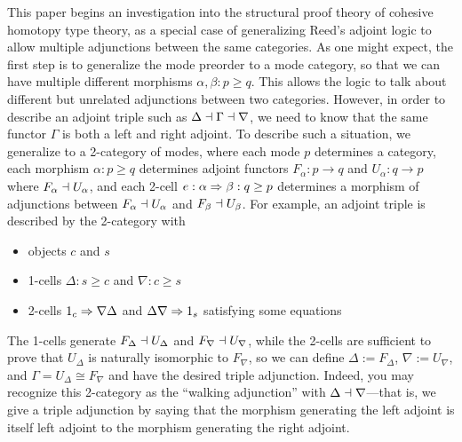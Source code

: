 \documentclass{drl-common/llncs}
\begin{document}
This paper begins an investigation into the structural proof theory of
cohesive homotopy type theory, as a special case of generalizing Reed's
adjoint logic to allow multiple adjunctions between the same categories.
As one might expect, the first step is to generalize the mode preorder
to a mode category, so that we can have multiple different morphisms
$\alpha, \beta : p\ge q$.  This allows the logic to talk about different
but unrelated adjunctions between two categories.  However, in order to
describe an adjoint triple such as $\Delta \dashv \Gamma \dashv \nabla$, we
need to know that the same functor $\Gamma$ is both a left and right
adjoint.  To describe such a situation, we generalize to a 2-category of
modes, where each mode $p$ determines a category, each morphism $\alpha
: p \ge q$ determines adjoint functors $F_\alpha : p \to q$ and
$U_\alpha : q \to p$ where $F_\alpha \dashv U_\alpha$, and each 2-cell $e :
\alpha \Rightarrow \beta : q \ge p$ determines a morphism of adjunctions between 
$F_\alpha \dashv U_\alpha$ and $F_\beta \dashv U_\beta$.  For example, an
adjoint triple is described by the 2-category with
\begin{itemize}
\item objects $c$ and $s$
\item 1-cells $\Delta : s \ge c$ and $\nabla : c \ge s$
\item 2-cells $1_c \Rightarrow \nabla \Delta$ 
and $\Delta \nabla \Rightarrow 1_s$ satisfying 
some equations
\end{itemize}
The 1-cells generate $F_\Delta \dashv U_\Delta$ and $F_\nabla \dashv
U_\nabla$, while the 2-cells are sufficient to prove that $U_\Delta$ is
naturally isomorphic to $F_\nabla$, so we can define $\Delta :=
F_\Delta$, $\nabla := U_\nabla$, and $\Gamma = U_\Delta \cong F_\nabla$
and have the desired triple adjunction.  Indeed, you may recognize this
2-category as the ``walking adjunction'' with $\Delta \dashv \nabla$---that
is, we give a triple adjunction by saying that the morphism generating
the left adjoint is itself left adjoint to the morphism generating the
right adjoint.
\end{document}
